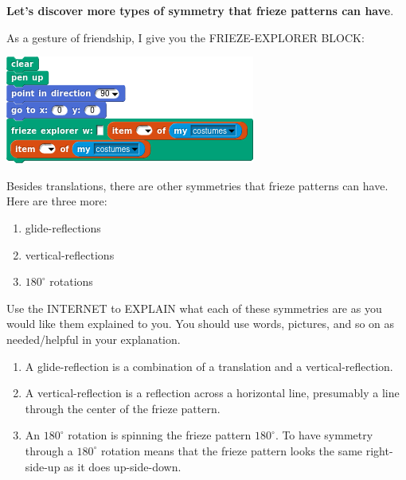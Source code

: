 \documentclass[noauthor,nooutcomes,hints,handout]{ximera}
\begin{document}
\textbf{Let's discover more types of symmetry that
  frieze patterns can have}.

As a gesture of friendship, I give you the FRIEZE-EXPLORER BLOCK:
\begin{center}
  \includegraphics{friezeExplorerSCRIPT.png}
\end{center}




\mynewpage



\begin{question}
  Besides translations, there are other symmetries that frieze
  patterns can have. Here are three more:
  \begin{enumerate}
  \item glide-reflections
  \item vertical-reflections
  \item $180^\circ$ rotations
  \end{enumerate}
  Use the INTERNET to EXPLAIN what each of these symmetries are as you
  would like them explained to you. You should use words, pictures,
  and so on as needed/helpful in your explanation.
  \begin{freeResponse}
    \begin{enumerate}
    \item A glide-reflection is a combination of a translation and a
      vertical-reflection.
    \item A vertical-reflection is a reflection across a horizontal
      line, presumably a line through the center of the frieze
      pattern.
    \item An $180^\circ$ rotation is spinning the frieze pattern
      $180^\circ$. To have symmetry through a $180^\circ$ rotation
      means that the frieze pattern looks the same right-side-up as it
      does up-side-down.
    \end{enumerate}
  \end{freeResponse}
\end{question}

\mynewpage
\end{document}
